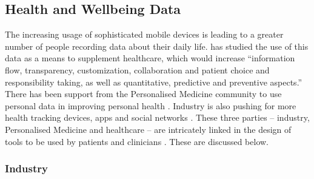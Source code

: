\documentclass[a4paper]{scrartcl}     %
\begin{document}
  \subsection{Health and Wellbeing Data}\label{sec:background:data}


    The increasing usage of sophisticated mobile devices is leading to a greater number of people recording data about their daily life. \citet{Swan2009} has studied the use of this data as a means to supplement healthcare, which would increase ``information flow, transparency, customization, collaboration and patient choice and responsibility taking, as well as quantitative, predictive and preventive aspects.'' There has been support from the Personalised Medicine community to use personal data in improving personal health \citep{Li2011}. Industry is also pushing for more health tracking devices, apps and social networks \citep{U.S.FoodandDrugAdministration2014}. These three parties -- industry, Personalised Medicine and healthcare -- are intricately linked in the design of tools to be used by patients and clinicians \citep{Taneva2014}. These are discussed below.

    \subsubsection{Industry}
\end{document}
